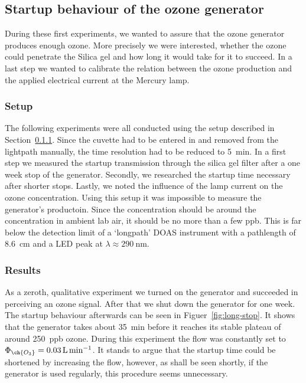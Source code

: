 \subsection{Startup behaviour of the ozone generator}
\label{sec:ozone}

During these first experiments, we wanted to assure that the ozone
generator produces enough ozone. More precisely we were interested,
whether the ozone could penetrate the Silica gel and how long it would
take for it to succeed. In a last step we wanted to calibrate the relation
between the ozone production and the applied electrical current at the
Mercury lamp.

\subsubsection{Setup}
\label{sec:ozone-setup}

The following experiments were all conducted using the setup described
in Section~\ref{sec:ozone-setup}. Since the cuvette had to be entered
in and removed from the lightpath manually, the time resolution had to
be reduced to \SI{5}{\minute}. In a first step we measured the startup
 transmission through the silica gel filter after a one week
stop of the generator. Secondly, we researched the startup time
necessary after shorter stops. Lastly, we noted the influence of the
lamp current on the ozone concentration. Using this setup it was
impossible to measure the generator's  productoin. Since the
concentration should be around the  concentration in ambient
lab air, it should be no more than a few \si{ppb}. This is far below
the detection limit of a `longpath' DOAS instrument with a pathlength
of \SI{8.6}{\centi\meter} and a LED peak at $\lambda \approx
\SI{290}{\nano\meter}$.

\subsubsection{Results}
\label{sec:ozone-results}

As a zeroth, qualitative experiment we turned on the generator
and succeeded in perceiving an ozone signal. After that we shut down the generator
for one week. The startup behaviour afterwards can be seen in
Figuer~\ref{fig:long-stop}. It shows that the generator takes about
\SI{35}{\minute} before it reaches its stable plateau of around
\SI{250}{ppb} ozone. During this experiment the flow was constantly
set to $\Phi_{\ch{O_3}} = \SI{0.03}{\liter\per\minute}$. It stands to
argue that the startup time could be shortened by increasing the flow,
however, as shall be seen shortly, if the
generator is used regularly, this procedure seems unnecessary.

